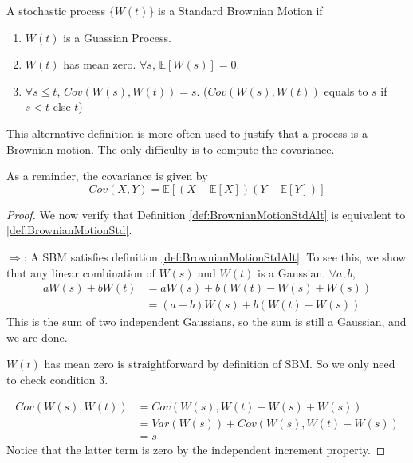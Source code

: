         \begin{definition}\label{def:BrownianMotionStdAlt}
            A stochastic process $\{W(t)\}$ is a Standard Brownian Motion if
            \begin{enumerate}
                \item $W(t)$ is a Guassian Process.
                \item $W(t)$ has mean zero. $\forall s$, $\mathbb{E}[W(s)] = 0$.
                \item $\forall s \le t$, $Cov(W(s), W(t)) = s$. ($Cov(W(s), W(t))$ equals to $s$ if $s < t$ else $t$)
            \end{enumerate}
        \end{definition}
        \begin{remark}
            This alternative definition is more often used to justify that a process is a Brownian motion. The only difficulty is to compute the covariance.

            As a reminder, the covariance is given by
            \[ Cov(X,Y) = \mathbb{E}[(X-\mathbb{E}[X])(Y-\mathbb{E}[Y])] \]
        \end{remark}
        \begin{proof}
            We now verify that Definition \ref{def:BrownianMotionStdAlt} is equivalent to \ref{def:BrownianMotionStd}.
            
            $\Rightarrow$: A SBM satisfies definition \ref{def:BrownianMotionStdAlt}. To see this, we show that any linear combination of $W(s)$ and $W(t)$ is a Gaussian. $\forall a,b$,
            \begin{align*}
                aW(s) + bW(t) &= aW(s) + b(W(t) - W(s) + W(s))\\
                &= (a+b)W(s) + b(W(t)-W(s))
            \end{align*}
            This is the sum of two independent Gaussians, so the sum is still a Gaussian, and we are done.

            $W(t)$ has mean zero is straightforward by definition of SBM. So we only need to check condition 3.

            \begin{align*}
                Cov(W(s), W(t)) &= Cov(W(s), W(t) - W(s) + W(s))\\
                &= Var(W(s)) + Cov(W(s), W(t) - W(s))\\
                &=s
            \end{align*}
            Notice that the latter term is zero by the independent increment property.
        \end{proof}

